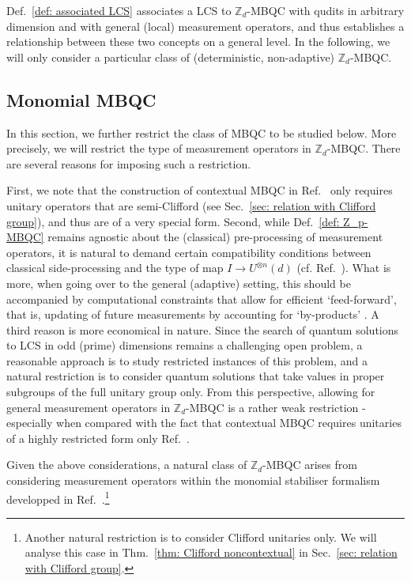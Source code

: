 \documentclass[aps,pra,letterpaper,onrcolumn,nofootinbib,notitlepage,longbibliography]{revtex4-1}
\newcommand{\ra}{\ensuremath{\rightarrow}}
\newcommand{\zz}{\mathbb Z}
\begin{document}
Def.~\ref{def: associated LCS} associates a LCS to $\zz_d$-MBQC with qudits in arbitrary dimension and with general (local) measurement operators, and thus establishes a relationship between these two concepts on a general level. In the following, we will only consider a particular class of (deterministic, non-adaptive) $\zz_d$-MBQC.



\subsection{Monomial MBQC}

In this section, we further restrict the class of MBQC to be studied below. More precisely, we will restrict the type of measurement operators in $\zz_d$-MBQC. There are several reasons for imposing such a restriction.

First, we note that the construction of contextual MBQC in Ref.~\cite{FrembsRobertsBartlett2018} only requires unitary operators that are semi-Clifford (see Sec.~\ref{sec: relation with Clifford group}), and thus are of a very special form. Second, while Def.~\ref{def: Z_p-MBQC} remains agnostic about the (classical) pre-processing of measurement operators, it is natural to demand certain compatibility conditions between classical side-processing and the type of map $I\ra U^{\otimes n}(d)$ (cf. Ref.~\cite{Raussendorf2013}). What is more, when going over to the general (adaptive) setting, this should be accompanied by computational constraints that allow for efficient `feed-forward', that is, updating of future measurements by accounting for `by-products' \cite{RaussendorfBriegel2001}. A third reason is more economical in nature. Since the search of quantum solutions to LCS in odd (prime) dimensions remains a challenging open problem, a reasonable approach is to study restricted instances of this problem, and a natural restriction is to consider quantum solutions that take values in proper subgroups of the full unitary group only. From this perspective, allowing for general measurement operators in $\zz_d$-MBQC is a rather weak restriction - especially when compared with the fact that contextual MBQC requires unitaries of a highly restricted form only Ref.~\cite{Raussendorf2013,Raussendorf2016,FrembsRobertsBartlett2018,FrembsRobertsCampbellBartlett2022}.

Given the above considerations, a natural class of $\zz_d$-MBQC arises from considering measurement operators within the monomial stabiliser formalism developped in Ref.~\cite{VanDenNest2011,vanDenNest2013}.\footnote{Another natural restriction is to consider Clifford unitaries only. We will analyse this case in Thm.~\ref{thm: Clifford noncontextual} in Sec.~\ref{sec: relation with Clifford group}.}
\end{document}

